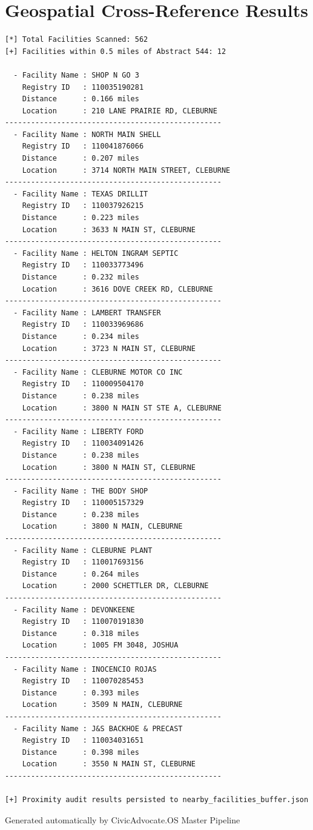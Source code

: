 \documentclass{article}
\begin{document}
\section*{Geospatial Cross-Reference Results}
\begin{verbatim}
[*] Total Facilities Scanned: 562
[+] Facilities within 0.5 miles of Abstract 544: 12

  - Facility Name : SHOP N GO 3
    Registry ID   : 110035190281
    Distance      : 0.166 miles
    Location      : 210 LANE PRAIRIE RD, CLEBURNE
--------------------------------------------------
  - Facility Name : NORTH MAIN SHELL
    Registry ID   : 110041876066
    Distance      : 0.207 miles
    Location      : 3714 NORTH MAIN STREET, CLEBURNE
--------------------------------------------------
  - Facility Name : TEXAS DRILLIT
    Registry ID   : 110037926215
    Distance      : 0.223 miles
    Location      : 3633 N MAIN ST, CLEBURNE
--------------------------------------------------
  - Facility Name : HELTON INGRAM SEPTIC
    Registry ID   : 110033773496
    Distance      : 0.232 miles
    Location      : 3616 DOVE CREEK RD, CLEBURNE
--------------------------------------------------
  - Facility Name : LAMBERT TRANSFER
    Registry ID   : 110033969686
    Distance      : 0.234 miles
    Location      : 3723 N MAIN ST, CLEBURNE
--------------------------------------------------
  - Facility Name : CLEBURNE MOTOR CO INC
    Registry ID   : 110009504170
    Distance      : 0.238 miles
    Location      : 3800 N MAIN ST STE A, CLEBURNE
--------------------------------------------------
  - Facility Name : LIBERTY FORD
    Registry ID   : 110034091426
    Distance      : 0.238 miles
    Location      : 3800 N MAIN ST, CLEBURNE
--------------------------------------------------
  - Facility Name : THE BODY SHOP
    Registry ID   : 110005157329
    Distance      : 0.238 miles
    Location      : 3800 N MAIN, CLEBURNE
--------------------------------------------------
  - Facility Name : CLEBURNE PLANT
    Registry ID   : 110017693156
    Distance      : 0.264 miles
    Location      : 2000 SCHETTLER DR, CLEBURNE
--------------------------------------------------
  - Facility Name : DEVONKEENE
    Registry ID   : 110070191830
    Distance      : 0.318 miles
    Location      : 1005 FM 3048, JOSHUA
--------------------------------------------------
  - Facility Name : INOCENCIO ROJAS
    Registry ID   : 110070285453
    Distance      : 0.393 miles
    Location      : 3509 N MAIN, CLEBURNE
--------------------------------------------------
  - Facility Name : J&S BACKHOE & PRECAST
    Registry ID   : 110034031651
    Distance      : 0.398 miles
    Location      : 3550 N MAIN ST, CLEBURNE
--------------------------------------------------

[+] Proximity audit results persisted to nearby_facilities_buffer.json
\end{verbatim}

\vfill
\begin{center}
\footnotesize{Generated automatically by CivicAdvocate.OS Master Pipeline}
\end{center}
\end{document}
